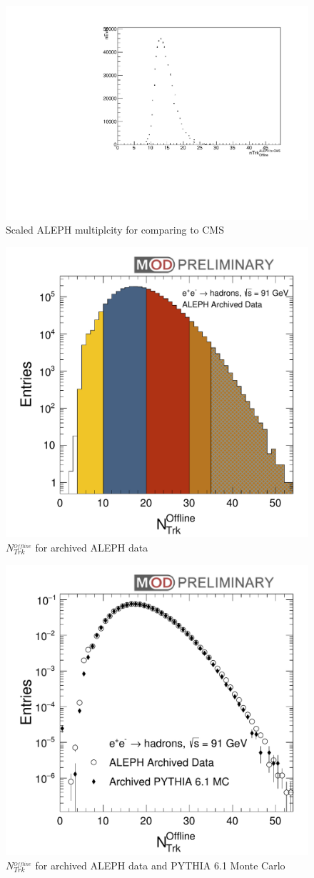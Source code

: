 \begin{figure}[!htb]
\begin{center}
\includegraphics[width=.45\textwidth]{images/MultiplicityConversion/new_nTrk_ALEPHConverted.pdf}
\caption{Scaled ALEPH multiplcity for comparing to CMS}
\label{fig:CMSComparison} 
\end{center}
\end{figure}

\begin{figure}[!htb]
\begin{center}
\includegraphics[width=.45\textwidth]{../../Plotting/src/plots/nTrkOffline.pdf}
\caption{$N_{Trk}^_{Offline}$ for archived ALEPH data}
\label{fig:nTrkOffline}
\end{center}
\end{figure}

\begin{figure}[!htb]
\begin{center}
\includegraphics[width=.45\textwidth]{../../Plotting/src/plots/nTrkOffline_MC.pdf}
\caption{$N_{Trk}^_{Offline}$ for archived ALEPH data and PYTHIA 6.1 Monte Carlo}
\label{fig:nTrkOffline_MC}
\end{center}
\end{figure}

